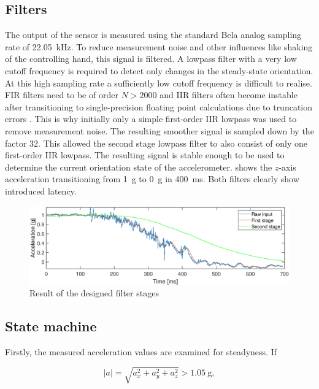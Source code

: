 \documentclass[a4paper, 12pt]{article}
\begin{document}
\subsection{Filters}
The output of the sensor is measured using the standard Bela analog sampling rate of \SI{22.05}{\kilo\hertz}. To reduce measurement noise and other influences like shaking of the controlling hand, this signal is filtered. A lowpass filter with a very low cutoff frequency is required to detect only changes in the steady-state orientation. At this high sampling rate a sufficiently low cutoff frequency is difficult to realise. FIR filters need to be of order $N>2000$ and IIR filters often become instable after transitioning to single-precision floating point calculations due to truncation errors \cite{Harris1998}. This is why initially only a simple first-order IIR lowpass was used to remove measurement noise. The resulting smoother signal is sampled down by the factor $32$. This allowed the second stage lowpass filter to also consist of only one first-order IIR lowpass. The resulting signal is stable enough to be used to determine the current orientation state of the accelerometer.  shows the $z$-axis acceleration transitioning from \SI{1}{\gram} to \SI{0}{\gram} in \SI{400}{\milli\second}. Both filters clearly show introduced latency.

\begin{figure}[h!]
	\centering
	\includegraphics[width=\textwidth]{filters.eps}
	\caption{Result of the designed filter stages}
	\label{fig:filtering}
\end{figure}

\subsection{State machine}
Firstly, the measured acceleration values are examined for steadyness. If 

\begin{equation}
	|a| = \sqrt{a_x^2 + a_y^2 + a_z^2} > \SI{1.05}{\gram},
\end{equation}
\end{document}
